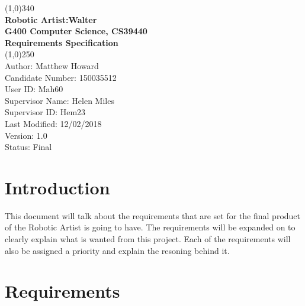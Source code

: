 \documentclass{article}
\begin{document}

    \begin{titlepage}

        \begin{center}

        \line(1,0){340}\\ 


        \large{\bfseries Robotic Artist:Walter} \\

        \large {\bfseries G400 Computer Science, CS39440 }\\
        
        \large {\bfseries Requirements Specification}\\


         \line(1,0){250}\\

         \textsf {Author: Matthew Howard \\
          Candidate Number: 150035512\\
          User ID: Mah60 \\
          Supervisor Name: Helen Miles \\
          Supervisor ID: Hem23\\
          Last Modified: 12/02/2018 \\
          Version: 1.0\\
          Status: Final} \\

        \end{center}        

    \end{titlepage}
  
    \clearpage

 	\tableofcontents
 	
 	\clearpage

    \section{Introduction}

This document will talk about the requirements that are set for the final product of the Robotic Artist is going to have. The requirements will be expanded on to clearly explain what is wanted from this project. Each of the requirements will also be assigned a priority and explain the resoning behind it.

	\section{Requirements}
	
\end{document}
